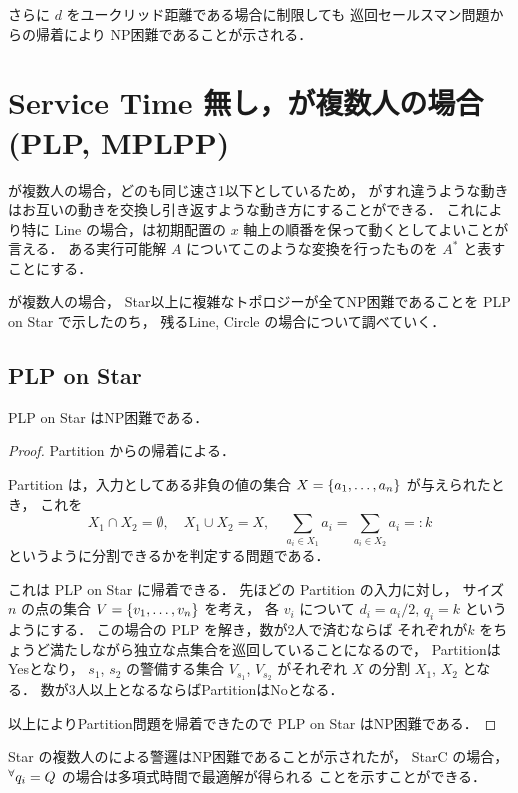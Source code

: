 さらに $d$ をユークリッド距離である場合に制限しても
巡回セールスマン問題からの帰着により NP困難であることが示される．




\section{Service Time 無し，\server が複数人の場合(PLP, MPLPP)}

\server が複数人の場合，どの\server も同じ速さ1以下としているため，
\server がすれ違うような動きはお互いの動きを交換し引き返すような動き方にすることができる．
これにより特に Line の場合，\server は初期配置の $x$ 軸上の順番を保って動くとしてよいことが言える．
ある実行可能解 $A$ についてこのような変換を行ったものを $A^*$ と表すことにする．


\server が複数人の場合，
Star以上に複雑なトポロジーが全てNP困難であることを PLP on Star で示したのち，
残るLine, Circle の場合について調べていく．



\subsection{PLP on Star}
\begin{theo}
	PLP on Star はNP困難である．
\end{theo}
\begin{proof}
Partition からの帰着による．

Partition は，入力としてある非負の値の集合
$X = \left\{{ a_1, \ldots, a_n }\right\}$ が与えられたとき，
これを
\[
	X_1 \cap X_2 = \emptyset,
	\quad
	X_1 \cup X_2 = X,
	\quad
	\sum_{a_i \in X_1} a_i
	 = \sum_{a_i \in X_2} a_i
	 =: k
\]
というように分割できるかを判定する問題である．

これは PLP on Star に帰着できる．
先ほどの Partition の入力に対し，
サイズ $n$ の点の集合 $V = \left\{{ v_1, \ldots, v_n }\right\}$ を考え，
各 $v_i$ について $d_i = a_i / 2$, $q_i = k$ というようにする．
この場合の PLP を解き，\server 数が2人で済むならば
それぞれが\shuki $k$ をちょうど満たしながら独立な点集合を巡回していることになるので，
PartitionはYesとなり，
\server $s_1$, $s_2$ の警備する集合 $V_{s_1}$, $V_{s_2}$ 
がそれぞれ $X$ の分割 $X_1$, $X_2$ となる．
\server 数が3人以上となるならばPartitionはNoとなる．

以上によりPartition問題を帰着できたので
PLP on Star はNP困難である．
\end{proof}



Star の複数人の\server による警邏はNP困難であることが示されたが，
StarC の場合， ${}^\forall q_i = Q$ の場合は多項式時間で最適解が得られる
ことを示すことができる．


